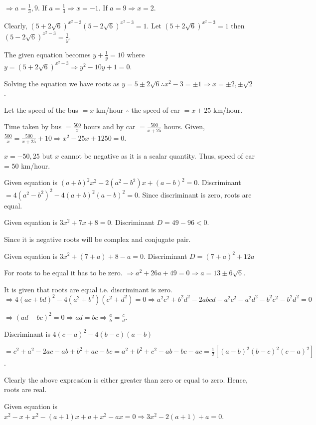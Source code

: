   $\Rightarrow a = \frac{1}{3}, 9$. If $a = \frac{1}{3} \Rightarrow x = -1$. If $a = 9 \Rightarrow x = 2$.
\item Clearly, $(5 + 2\sqrt{6})^{x^2 - 3}(5 - 2\sqrt{6})^{x^2 - 3} = 1$. Let $(5 + 2\sqrt{6})^{x^2 - 3} = 1$
  then $(5 - 2\sqrt{6})^{x^2 - 3} = \frac{1}{y}$.

  The given equation becomes $y + \frac{1}{y} = 10$ where $y = (5 + 2\sqrt{6})^{x^2 - 3}\Rightarrow y^2 -10y
  + 1 = 0$.

  Solving the equation we have roots as $y = 5 \pm 2\sqrt{6}\therefore x^2 - 3 = \pm 1\Rightarrow x = \pm2,
  \pm\sqrt{2}$.
\item Let the speed of the bus $= x$ km/hour $\therefore$ the speed of car $= x + 25$ km/hour.

  Time taken by bus $= \frac{500}{x}$ hours and by car $= \frac{500}{x + 25}$ hours. Given, $\frac{500}{x} =
  \frac{500}{x + 25} + 10\Rightarrow x^2 - 25x + 1250 = 0$.

  $x = -50, 25$ but $x$ cannot be negative as it is a scalar quantity. Thus, speed of car = $50$ km/hour.
\item Given equation is $(a + b)^2x^2 - 2(a^2 - b^2)x + (a - b)^2 = 0$. Discriminant $= 4(a^2 - b^2)^2 - 4(a
  + b)^2(a - b)^2 = 0$. Since discriminant is zero, roots are equal.
\item Given equation is $3x^2 + 7x + 8 = 0$. Discriminant $D = 49 - 96 < 0$.

  Since it is negative roots will be complex and conjugate pair.
\item Given equation is $3x^2 + (7 + a) + 8 - a = 0$. Discriminant $D = (7 + a)^2 + 12a$

  For roots to be equal it has to be zero. $\Rightarrow a^2 + 26a + 49 = 0\Rightarrow a = 13 \pm
  6\sqrt{6}$.
\item It is given that roots are equal i.e. discriminant is zero. $\Rightarrow 4(ac + bd)^2 - 4(a^2 +
  b^2)(c^2 + d^2) = 0\Rightarrow a^2c^2 + b^2d^2 - 2abcd - a^2c^2 - a^2d^2 - b^2c^2 - b^2d^2 = 0$

  $\Rightarrow (ad - bc)^2 = 0\Rightarrow ad = bc \Rightarrow \frac{a}{b} = \frac{c}{d}$.
\item Discriminant is $4(c - a)^2 - 4(b - c)(a - b)$

  $= c^2 + a^2 -2ac - ab + b^2 + ac - bc = a^2 + b^2 + c^2 - ab - bc - ac = \frac{1}{2}[(a - b)^2(b - c)^2(c
  - a)^2]$.

  Clearly the above expression is either greater than zero or equal to zero. Hence, roots are real.
\item Given equation is $x^2 - x + x^2 - (a + 1)x + a + x^2 - ax = 0\Rightarrow 3x^2 - 2(a + 1) + a = 0$.

